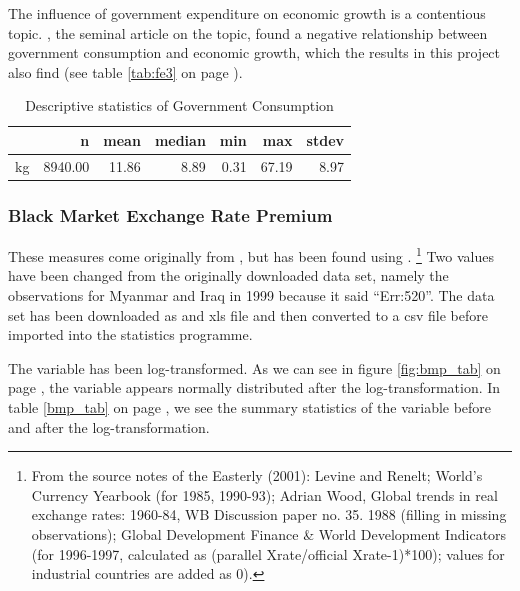 \documentclass{article}\usepackage{graphicx, color}
\begin{document}
The influence of government expenditure on economic growth is a contentious
topic. \citet{barro1991government}, the seminal article on the topic,
found a negative relationship between government consumption and economic
growth, which the results in this project also find (see table \ref{tab:fe3}
on page \pageref{tab:fe3}).

\begin{table}[ht]
\centering
\begin{tabular}{rrrrrrr}
  \hline
 & n & mean & median & min & max & stdev \\ 
  \hline
kg & 8940.00 & 11.86 & 8.89 & 0.31 & 67.19 & 8.97 \\ 
   \hline
\end{tabular}
\caption{Descriptive statistics of Government Consumption} 
\label{kg_tab}
\end{table}




\subsubsection{Black Market Exchange Rate Premium}

These measures come originally from \citet{wood1991globaltrends},
but has been found using \citet{easterly2001globaldevelopment}.%
\footnote{From the source notes of the Easterly (2001): Levine and Renelt; World's
Currency Yearbook (for 1985, 1990-93); Adrian Wood, Global trends
in real exchange rates: 1960-84, WB Discussion paper no. 35. 1988
(filling in missing observations); Global Development Finance \& World
Development Indicators (for 1996-1997, calculated as (parallel Xrate/official
Xrate-1){*}100); values for industrial countries are added as 0).%
} Two values have been changed from the originally downloaded data
set, namely the observations for Myanmar and Iraq in 1999 because
it said ``Err:520''. The data set has been downloaded as and xls
file and then converted to a csv file before imported into the statistics
programme. 

The variable has been log-transformed. As we can see in figure \ref{fig:bmp_tab}
on page \pageref{fig:bmp_tab}, the variable appears normally distributed
after the log-transformation. In table \ref{bmp_tab} on page \pageref{bmp_tab},
we see the summary statistics of the variable before and after the
log-transformation.
\end{document}
